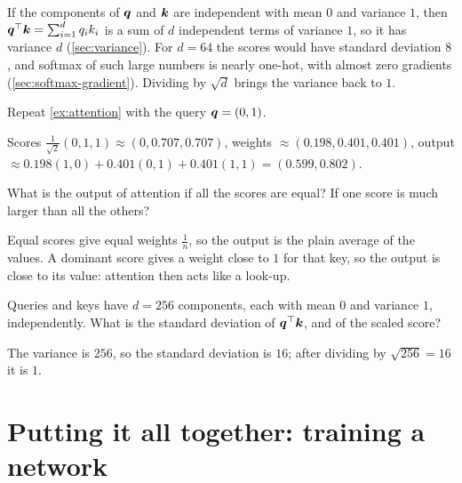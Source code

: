 \begin{intuition}
If the components of $\bm{q}$ and $\bm{k}$ are independent with mean $0$ and variance $1$,
then $\bm{q}^\top\bm{k} = \sum_{i=1}^dq_ik_i$ is a sum of $d$ independent terms of variance
$1$, so it has variance $d$ (\cref{sec:variance}). For $d = 64$ the scores would
have standard deviation $8$, and softmax of such large numbers is nearly one-hot,
with almost zero gradients (\cref{sec:softmax-gradient}). Dividing by $\sqrt d$
brings the variance back to $1$.
\end{intuition}

\sectionexercises

\begin{exercise}
Repeat \cref{ex:attention} with the query $\bm{q} = (0, 1)$.
\end{exercise}
\begin{solution}
Scores $\tfrac{1}{\sqrt2}(0, 1, 1) \approx (0, 0.707, 0.707)$, weights
$\approx (0.198, 0.401, 0.401)$, output $\approx 0.198(1, 0) + 0.401(0, 1) + 0.401(1,
1) = (0.599, 0.802)$.
\end{solution}

\begin{exercise}
What is the output of attention if all the scores are equal? If one score is much
larger than all the others?
\end{exercise}
\begin{solution}
Equal scores give equal weights $\tfrac1n$, so the output is the plain average of
the values. A dominant score gives a weight close to $1$ for that key, so the output
is close to its value: attention then acts like a look-up.
\end{solution}

\begin{exercise}
Queries and keys have $d = 256$ components, each with mean $0$ and variance $1$,
independently. What is the standard deviation of $\bm{q}^\top\bm{k}$, and of the scaled
score?
\end{exercise}
\begin{solution}
The variance is $256$, so the standard deviation is $16$; after dividing by
$\sqrt{256} = 16$ it is $1$.
\end{solution}

\section{Putting it all together: training a network}\label{sec:training-loop}

